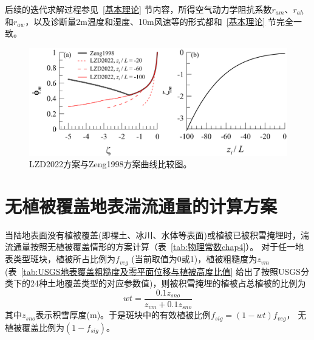 后续的迭代求解过程参见~\ref{基本理论} 节内容，所得空气动力学阻抗系数$r_{am}$、$r_{ah}$和$r_{aw}$，以及诊断量2m温度和湿度、10m风速等的形式都和~\ref{基本理论} 节完全一致。
{
\begin{figure}[]
\centering
\includegraphics[scale=0.7]{Figures/地表湍流交换过程/LZD2022方案与Zeng1998方案曲线比较图.png}
\caption{LZD2022方案与Zeng1998方案曲线比较图。}
\label{fig:LZD2022方案与Zeng1998方案曲线比较图}
\end{figure}
}


\section{无植被覆盖地表湍流通量的计算方案}\label{无植被覆盖地表湍流通量的计算方案}
当陆地表面没有植被覆盖(即裸土、冰川、水体等表面)或植被已被积雪掩埋时，湍流通量按照无植被覆盖情形的方案计算（表~\ref{tab:物理常数chap4}）。
对于任一地表类型斑块，植被所占比例为$f_{veg}$ (当前取值为0或1)，植被粗糙度为$z_{vm}$
(表~\ref{tab:USGS地表覆盖粗糙度及零平面位移与植被高度比值} 给出了按照USGS分类下的24种土地覆盖类型的对应参数值)，则被积雪掩埋的植被占总植被的比例为
\begin{equation}
wt=\frac{0.1 z_{{sno}}}{z_{v m}+0.1 z_{{sno}}}
\end{equation}
其中$z_{sno}$表示积雪厚度(m)。于是斑块中的有效植被比例$f_{sig}=\left(1-wt\right)f_{veg}$，
无植被覆盖比例为$\left(1-f_{sig}\right)$。

